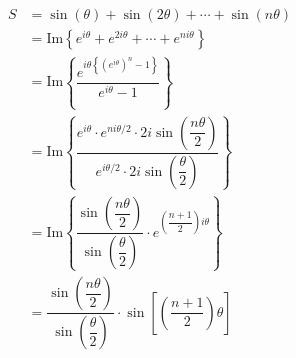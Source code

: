 \addtolength{\jot}{3ex}
\begin{align*}
S &= \sin(\theta) + \sin(2\theta) + \cdots + \sin(n\theta)\\
  &= \text{Im}\left\{e^{i\theta} + e^{2i\theta}+ \cdots + e^{ni\theta} \right\}\\
  &= \text{Im}\left\{\dfrac{e^{i\theta\left\{ \left(e^{i\theta}\right)^n -1\right\}}}{e^{i\theta}-1}\right\}\\
  &= \text{Im}\left\{ \dfrac{e^{i\theta}\cdot e^{ni\theta/2}\cdot 2i\sin\left(\dfrac{n\theta}{2}\right)}{e^{i\theta/2}\cdot 2i\sin\left(\dfrac{\theta}{2}\right)} \right\}\\
  &= \text{Im}\left\{ \dfrac{\sin\left(\dfrac{n\theta}{2}\right)}{\sin\left(\dfrac{\theta}{2}\right)} \cdot e^{\left(\dfrac{n+1}{2}\right) i\theta} \right\}\\
  &= \dfrac{\sin\left(\dfrac{n\theta}{2}\right)}{\sin\left(\dfrac{\theta}{2}\right)} \cdot \sin{\left[\left(\dfrac{n+1}{2}\right) \theta \right]}
\end{align*}
